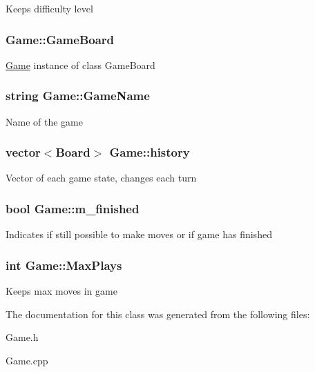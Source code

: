 Keeps difficulty level \hypertarget{class_game_aeb67bc4fc06221330cfd7c862c85b66d}{
\subsubsection[{Game\-Board}]{ Game\-::\-Game\-Board}}\label{class_game_aeb67bc4fc06221330cfd7c862c85b66d}
\hyperlink{class_game}{Game} instance of class Game\-Board \hypertarget{class_game_a1b56d5db37d900da0911378cc01f4cad}{
\subsubsection[{Game\-Name}]{\setlength{\rightskip}{0pt plus 5cm}string Game\-::\-Game\-Name\hspace{0.3cm}{\ttfamily [protected]}}}\label{class_game_a1b56d5db37d900da0911378cc01f4cad}
Name of the game \hypertarget{class_game_a7c0dd74fa2e5c366638596b7e82428f1}{
\subsubsection[{history}]{\setlength{\rightskip}{0pt plus 5cm}vector$<${\bf Board}$>$ Game\-::history\hspace{0.3cm}{\ttfamily [protected]}}}\label{class_game_a7c0dd74fa2e5c366638596b7e82428f1}
Vector of each game state, changes each turn \hypertarget{class_game_aee0b70deb19422d35b2061beb339bdf8}{
\subsubsection[{m\-\_\-finished}]{\setlength{\rightskip}{0pt plus 5cm}bool Game\-::m\-\_\-finished}}\label{class_game_aee0b70deb19422d35b2061beb339bdf8}
Indicates if still possible to make moves or if game has finished \hypertarget{class_game_a53cb9be6604469db6b3abac24c5a2ab6}{
\subsubsection[{Max\-Plays}]{\setlength{\rightskip}{0pt plus 5cm}int Game\-::\-Max\-Plays\hspace{0.3cm}{\ttfamily [protected]}}}\label{class_game_a53cb9be6604469db6b3abac24c5a2ab6}
Keeps max moves in game 

The documentation for this class was generated from the following files\-:\begin{DoxyCompactItemize}
\item 
Game.\-h\item 
Game.\-cpp\end{DoxyCompactItemize}
